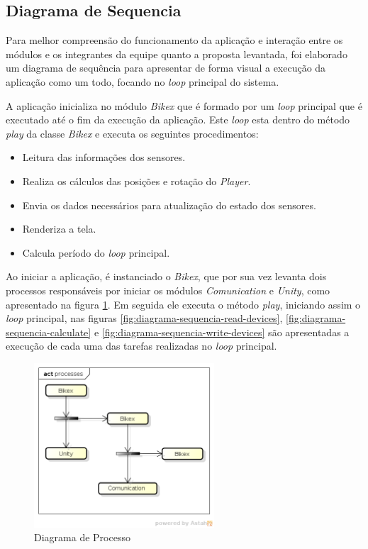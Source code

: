 \subsection{Diagrama de Sequencia} %
\label{sec:diagrama_de_sequencia}

Para melhor compreensão do funcionamento da aplicação e interação entre os módulos e os integrantes da equipe quanto a proposta 
levantada, foi elaborado um diagrama de sequência para apresentar de forma visual a execução da aplicação como um todo, focando 
no \textit{loop} principal do sistema.

A aplicação inicializa no módulo \textit{Bikex} que é formado por um \textit{loop} principal que é executado até o fim da 
execução da aplicação. Este \textit{loop} esta dentro do método \textit{play} da classe \textit{Bikex} e executa os seguintes 
procedimentos:

\begin{itemize}
	\item Leitura das informações dos sensores.
	\item Realiza os cálculos das posições e rotação do \textit{Player}.
	\item Envia os dados necessários para atualização do estado dos sensores.
	\item Renderiza a tela.
	\item Calcula período do \textit{loop} principal.
\end{itemize}

Ao iniciar a aplicação, é  instanciado o \textit{Bikex}, que por sua vez levanta dois processos responsáveis por iniciar os módulos \textit{Comunication} e \textit{Unity}, como apresentado na figura \ref{fig:diagrama-processo}. Em seguida ele executa o método \textit{play}, iniciando assim o \textit{loop} principal, nas figuras \ref{fig:diagrama-sequencia-read-devices}, \ref{fig:diagrama-sequencia-calculate} e \ref{fig:diagrama-sequencia-write-devices} são apresentadas a execução de cada uma das tarefas realizadas no \textit{loop} principal. 

\begin{figure}[h]
  \centering
	\includegraphics[width=0.6\textwidth]{figuras/processes}
  \caption{Diagrama de Processo}
  \label{fig:diagrama-processo}
\end{figure}

